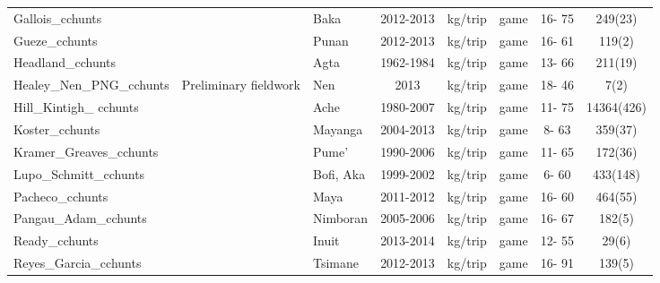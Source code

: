 \begin{landscape}
\begin{longtable}{M{2.6cm} M{3.6cm} M{1.5cm} c c M{1cm} c c}
Gallois\_cchunts               & \cite{reyes-garcia_adaptive_2016}         & Baka            & 2012-2013  & kg/trip   & game               & 16- 75  & 249(23)     \\
Gueze\_cchunts                 & \cite{reyes-garcia_adaptive_2016}         & Punan           & 2012-2013  & kg/trip   & game               & 16- 61  & 119(2)      \\
Headland\_cchunts              & \cite{headland_why_1986}                  & Agta            & 1962-1984  & kg/trip   & game               & 13- 66  & 211(19)     \\
Healey\_Nen\_PNG\_cchunts        & Preliminary fieldwork                     & Nen             & 2013       & kg/trip   & game               & 18- 46  & 7(2)        \\
Hill\_Kintigh\_ cchunts          & \cite{hill_can_2009}                      & Ache            & 1980-2007  & kg/trip   & game               & 11- 75  & 14364(426)  \\
Koster\_cchunts                & \cite{koster_hunting_2008}                & Mayanga         & 2004-2013  & kg/trip   & game               & 8- 63   & 359(37)     \\
Kramer\_Greaves\_cchunts        & \cite{kramer_why_2017}                    & Pume'           & 1990-2006  & kg/trip   & game               & 11- 65  & 172(36)     \\
Lupo\_Schmitt\_cchunts          & \cite{lupo_upper_2002}                    & Bofi, Aka       & 1999-2002  & kg/trip   & game               & 6- 60   & 433(148)    \\
Pacheco\_cchunts               & \cite{pacheco-cobos_economic_2015}        & Maya            & 2011-2012  & kg/trip   & game               & 16- 60  & 464(55)     \\
Pangau\_Adam\_cchunts           & \cite{pangau-adam_wildmeat_2012}          & Nimboran        & 2005-2006  & kg/trip   & game               & 16- 67  & 182(5)      \\
Ready\_cchunts                 & \cite{ready_food_2016}                    & Inuit           & 2013-2014  & kg/trip   & game               & 12- 55  & 29(6)       \\
Reyes\_Garcia\_cchunts          & \cite{reyes-garcia_adaptive_2016}         & Tsimane         & 2012-2013  & kg/trip   & game               & 16- 91  & 139(5)      \\

\end{longtable}
\end{landscape}
